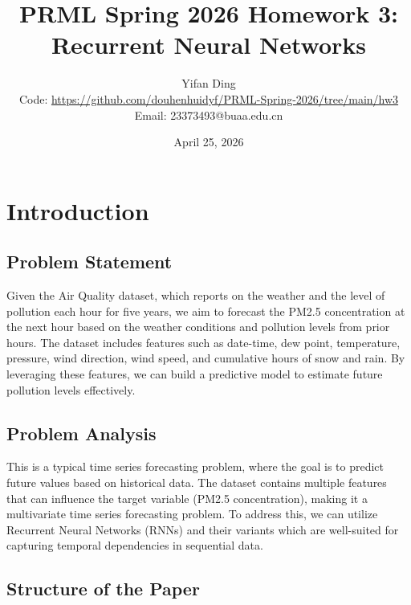 \documentclass{article}
\title{PRML Spring 2026 Homework 3: Recurrent Neural Networks}
\author{Yifan Ding \\
        \small Code: \url{https://github.com/douhenhuidyf/PRML-Spring-2026/tree/main/hw3} \\
        \small Email: 23373493@buaa.edu.cn}
\date{April 25, 2026}
\begin{document}
\maketitle




\section{Introduction}
\subsection{Problem Statement}
Given the Air Quality dataset\cite{dataset}, which reports on the weather and the level of pollution each hour for five years,
we aim to forecast the PM2.5 concentration at the next hour based on the weather conditions and pollution levels from prior hours.
The dataset includes features such as date-time, dew point, temperature, pressure, wind direction, wind speed, and cumulative hours of snow and rain.
By leveraging these features, we can build a predictive model to estimate future pollution levels effectively.
\subsection{Problem Analysis}
This is a typical time series forecasting problem, where the goal is to predict future values based on historical data.
The dataset contains multiple features that can influence the target variable (PM2.5 concentration), making it a multivariate time series forecasting problem.
To address this, we can utilize Recurrent Neural Networks (RNNs) and their variants which are well-suited for capturing temporal dependencies in sequential data.

\subsection{Structure of the Paper}
\end{document}
